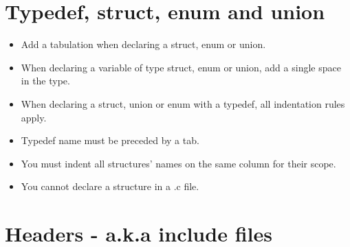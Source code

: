 \documentclass{42-ru}
\begin{document}
    \section{Typedef, struct, enum and union}

        \begin{itemize}

            \item Add a tabulation when declaring a struct, enum or union.

            \item When declaring a variable of type struct, enum or union,
                add a single space in the type.

            \item When declaring a struct, union or enum with a typedef,
                all indentation rules apply.

            \item Typedef name must be preceded by a tab.

            \item You must indent all structures' names on the same column for their scope.

            \item You cannot declare a structure in a .c file.

        \end{itemize}
        \newpage


    \section{Headers - a.k.a include files}
\end{document}
